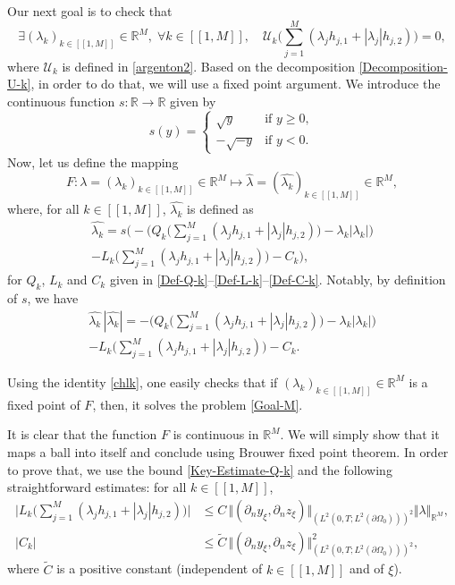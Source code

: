 \documentclass[JEP,XML,SOM,Unicode,NoFloatCountersInSection]{cedram}
\newcommand{\llbracket}{[\![}
\newcommand{\rrbracket}{]\!]}
\newcommand\R{{\mathbb R}}
\newcommand{\norm}[1]{\Vert#1\Vert}
\theoremstyle{definition}
\begin{document}
Our next goal is to check that
\begin{equation}
\label{Goal-M}
\exists (\lambda_{k})_{k \in \llbracket 1,M \rrbracket } \in \R^{M}
,\;\forall k \in \llbracket 1,M \rrbracket,
\quad
\mathcal{U}_k\biggl(
\sum_{j= 1}^M (\lambda_{j} h_{j,1} + |\lambda_{j}| h_{j,2})
\biggr)
= 0,
\end{equation}
where $\mathcal{U}_k$ is defined in \eqref{argenton2}. Based on the decomposition \eqref{Decomposition-U-k}, in order to do that, we will use a fixed point argument. We introduce the continuous function $s:\mathbb R\to \mathbb R$ given by\vspace*{-3pt}
\[
s(y)=\begin{cases}
\sqrt{y}&\text{if }y\geqslant 0,\\
-\sqrt{-y}&\text{if } y<0.
\end{cases}
\]
Now, let us define the mapping
\[
F : \lambda = (\lambda_{k})_{k \in \llbracket 1,M \rrbracket } \in \R^{M} \longmapsto \widehat \lambda = (\widehat{\lambda_{k}})_{k \in \llbracket 1,M \rrbracket } \in \R^{M},
\]
where, for all $k \in \llbracket 1,M \rrbracket $, $\widehat{\lambda_k}$ is defined as
\begin{multline*}
\widehat{\lambda_k}= s \biggl(- \biggl(Q_k\biggl(\sum_{j= 1}^M (\lambda_{j} h_{j,1} + |\lambda_{j}| h_{j,2})\biggr)- \lambda_k |\lambda_k| \biggr)\\[-10pt]
- L_k \biggl(\sum_{j= 1}^M (\lambda_{j} h_{j,1} + |\lambda_{j}| h_{j,2})\biggr)- C_k\biggr),
\end{multline*}
for $Q_k$, $L_k$ and $C_k$ given in \eqref{Def-Q-k}--\eqref{Def-L-k}--\eqref{Def-C-k}. Notably, by definition of $s$, we have
\begin{multline}\label{chlk}
\widehat{\lambda_k}\, |\widehat{\lambda_k}| = - \biggl(Q_k\biggl(\sum_{j= 1}^M (\lambda_{j} h_{j,1} + |\lambda_{j}| h_{j,2})\biggl)- \lambda_k |\lambda_k| \biggr)\\[-5pt]
- L_k \biggl(\sum_{j= 1}^M (\lambda_{j} h_{j,1} + |\lambda_{j}| h_{j,2})\biggr)- C_k.
\end{multline}

Using the identity \eqref{chlk}, one easily checks that if $(\lambda_{k})_{k \in \llbracket 1,M \rrbracket } \in \R^{M} $ is a fixed point of $F$, then, it solves the problem \eqref{Goal-M}.

It is clear that the function $F$ is continuous in $\R^M$. We will simply show that it maps a ball into itself and conclude using Brouwer fixed point theorem. In order to prove that, we use the bound \eqref{Key-Estimate-Q-k} and the following straightforward estimates: for all $k \in \llbracket 1,M \rrbracket $,
\begin{align*}
\biggl| L_k\biggl(
\sum_{j= 1}^M (\lambda_{j} h_{j,1} + |\lambda_{j}| h_{j,2})
\biggr)
\biggr|
&\leq C\, \norm{(\partial_n y_\xi, \partial_n z_\xi)}_{(L^2(0,T; L^2(\partial \Omega_0)))^2} \norm{\lambda}_{\R^M},
\\
| C_k | &\leq \tilde{C}\,\norm{(\partial_n y_\xi, \partial_n z_\xi)}_{(L^2(0,T; L^2(\partial \Omega_0)))^2}^2,
\end{align*}
where {$\tilde{C}$} is a positive constant (independent of $k \in \llbracket 1,M \rrbracket $ and of $\xi$).
\end{document}
